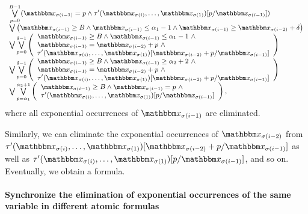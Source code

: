 \[
\small
\begin{array}{l}
\bigvee \limits_{p=0}^{B-1} ( \ivarx_{\sigma(i-1)} = p \wedge \tau'(\ivarx_{\sigma(i)}, \ldots, \ivarx_{\sigma(1)}) [p/\ivarx_{\sigma(i-1)}])   \\
\bigvee \big(\ivarx_{\sigma(i-1)} \ge B \wedge \ivarx_{\sigma(i-1)} \le \alpha_1  - 1  \wedge \ivarx_{\sigma(i-1)} \ge \ivarx_{\sigma(i-2)} +\delta \big)\\
%
\bigvee \bigvee \limits_{p=0}^{\delta-1} 
\left(
\begin{array}{l}
\ivarx_{\sigma(i-1)} \ge B \wedge \ivarx_{\sigma(i-1)} \le \alpha_1  -1 \ \wedge \\
 \ivarx_{\sigma(i-1)} = \ivarx_{\sigma(i-2)} +p\ \wedge\\
 \tau'(\ivarx_{\sigma(i)}, \ldots, \ivarx_{\sigma(1)})[\ivarx_{\sigma(i-2)} + p /\ivarx_{\sigma(i-1)}] 
\end{array}
\right)\\
\bigvee \bigvee \limits_{p=0}^{\delta-1} 
\left(
\begin{array}{l}
\ivarx_{\sigma(i-1)} \ge B \wedge \ivarx_{\sigma(i-1)} \ge \alpha_2 + 2 \ \wedge \\
 \ivarx_{\sigma(i-1)} = \ivarx_{\sigma(i-2)} +p\ \wedge\\
 \tau'(\ivarx_{\sigma(i)}, \ldots, \ivarx_{\sigma(1)})[\ivarx_{\sigma(i-2)} + p /\ivarx_{\sigma(i-1)}] 
\end{array}
\right)\\
\bigvee \bigvee \limits_{p = \alpha_1}^{\alpha_2 + 1}
\left(
\begin{array}{l}
\ivarx_{\sigma(i-1)} \ge B \wedge \ivarx_{\sigma(i-1)} = p\ \wedge \\
 \tau'(\ivarx_{\sigma(i)}, \ldots, \ivarx_{\sigma(1)})[p /\ivarx_{\sigma(i-1)}] 
\end{array}
\right),
\end{array}
\]
where all exponential occurrences of $\ivarx_{\sigma(i-1)}$ are eliminated.

Similarly, we can eliminate the exponential occurrences of $\ivarx_{\sigma(i-2)}$ from $\tau'(\ivarx_{\sigma(i)}, \ldots, \ivarx_{\sigma(1)})[\ivarx_{\sigma(i-2)} + p /\ivarx_{\sigma(i-1)}]$ as well as  $\tau'(\ivarx_{\sigma(i)}, \ldots, \ivarx_{\sigma(1)})[p /\ivarx_{\sigma(i-1)}]$, and so on. Eventually, we obtain a {\pa} formula.


\paragraph{Synchronize the elimination of exponential occurrences of the same variable in different atomic formulas}

